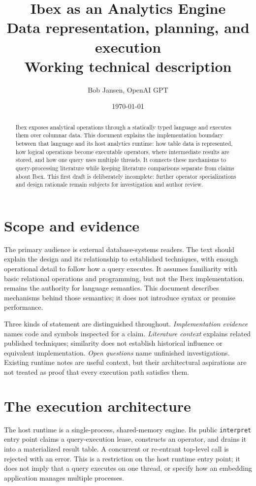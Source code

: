 \documentclass[11pt,a4paper]{article}
\title{Ibex as an Analytics Engine\\\large Data representation, planning, and execution
\\Working technical description}
\author{Bob Jansen, OpenAI GPT}
\date{\today}
\newcommand{\code}[1]{\nolinkurl{#1}}
\newcommand{\src}[1]{\path{#1}}
\begin{document}
\maketitle
\begin{abstract}
  \noindent
  Ibex exposes analytical operations through a statically typed language and
  executes them over columnar data. This document explains the implementation
  boundary between that language and its host analytics runtime: how table data
  is represented, how logical operations become executable operators, where
  intermediate results are stored, and how one query uses multiple threads.
  It connects these mechanisms to query-processing literature while keeping
  literature comparisons separate from claims about Ibex. This first draft is
  deliberately incomplete: further operator specializations and design rationale
  remain subjects for investigation and author review.
\end{abstract}

\section{Scope and evidence}
The primary audience is external database-systems readers. The text should
explain the design and its relationship to established techniques, with enough
operational detail to follow how a query executes. It assumes familiarity with
basic relational operations and programming, but not the Ibex implementation.
\src{SPEC.md} remains the authority
for language semantics. This document describes mechanisms behind those
semantics; it does not introduce syntax or promise performance.

Three kinds of statement are distinguished throughout. \emph{Implementation
evidence} names code and symbols inspected for a claim. \emph{Literature
context} explains related published techniques; similarity does not establish
historical influence or equivalent implementation. \emph{Open questions} name
unfinished investigations. Existing runtime notes are useful context, but
their architectural aspirations are not treated as proof that every execution
path satisfies them.

\section{The execution architecture}
The host runtime is a single-process, shared-memory engine. Its public
\code{interpret} entry point claims a query-execution lease, constructs an
operator, and drains it into a materialized result table. A concurrent or
re-entrant top-level call is rejected with an error. This is a restriction on
the host runtime entry point; it does not imply that a query executes on one
thread, or specify how an embedding application manages multiple processes.
\end{document}
